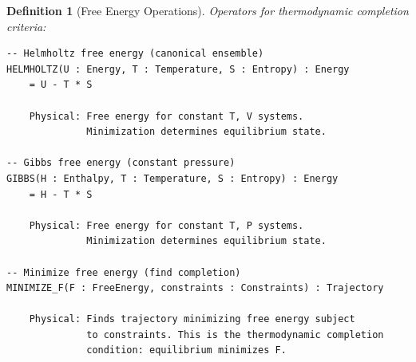 \documentclass[aps,prd,twocolumn,superscriptaddress,floatfix,nofootinbib]{revtex4-2}
\newtheorem{definition}[theorem]{Definition}
\theoremstyle{remark}
\begin{document}
\begin{definition}[Free Energy Operations]
\label{def:free_energy_ops}
Operators for thermodynamic completion criteria:
\begin{verbatim}
-- Helmholtz free energy (canonical ensemble)
HELMHOLTZ(U : Energy, T : Temperature, S : Entropy) : Energy
    = U - T * S
    
    Physical: Free energy for constant T, V systems.
              Minimization determines equilibrium state.

-- Gibbs free energy (constant pressure)
GIBBS(H : Enthalpy, T : Temperature, S : Entropy) : Energy
    = H - T * S
    
    Physical: Free energy for constant T, P systems.
              Minimization determines equilibrium state.

-- Minimize free energy (find completion)
MINIMIZE_F(F : FreeEnergy, constraints : Constraints) : Trajectory
    
    Physical: Finds trajectory minimizing free energy subject
              to constraints. This is the thermodynamic completion
              condition: equilibrium minimizes F.
\end{verbatim}
\end{definition}
\end{document}
